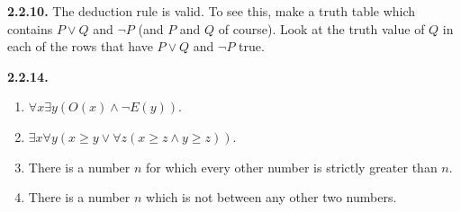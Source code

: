 \documentclass[10pt,]{book}
\theoremstyle{plain}
\theoremstyle{definition}
\theoremstyle{definition}
\theoremstyle{definition}
\theoremstyle{definition}
\numberwithin{equation}{chapter}
\begin{document}
%
\par\smallskip
\noindent\textbf{2.2.10.} \hypertarget{p-1258}{}%
The deduction rule is valid. To see this, make a truth table which contains \(P \vee Q\) and \(\neg P\) (and \(P\) and \(Q\) of course). Look at the truth value of \(Q\) in each of the rows that have \(P \vee Q\) and \(\neg P\) true.%
\par\smallskip
\noindent\textbf{2.2.14.} \hypertarget{p-1270}{}%
\leavevmode%
\begin{enumerate}[label=(\alph*)]
\item\hypertarget{li-627}{}\(\forall x \exists y (O(x) \wedge \neg E(y))\).%
\item\hypertarget{li-628}{}\(\exists x \forall y (x \ge y \vee \forall z (x \ge z \wedge y \ge z))\).%
\item\hypertarget{li-629}{}\hypertarget{p-1271}{}%
There is a number \(n\) for which every other number is strictly greater than \(n\).%
\item\hypertarget{li-630}{}\hypertarget{p-1272}{}%
There is a number \(n\) which is not between any other two numbers.%
\end{enumerate}
%
\par\smallskip
\end{document}
